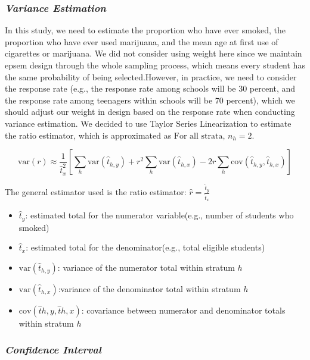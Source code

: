 \documentclass[
  12pt]{article}
\begin{document}
\subsubsection{\texorpdfstring{\emph{Variance
Estimation}}{Variance Estimation}}\label{variance-estimation}

In this study, we need to estimate the proportion who have ever smoked,
the proportion who have ever used marijuana, and the mean age at first
use of cigarettes or marijuana. We did not consider using weight here
since we maintain epsem design through the whole sampling process, which
means every student has the same probability of being selected.However,
in practice, we need to consider the response rate (e.g., the response
rate among schools will be 30 percent, and the response rate among
teenagers within schools will be 70 percent), which we should adjust our
weight in design based on the response rate when conducting variance
estimation. We decided to use Taylor Series Linearization to estimate
the ratio estimator, which is approximated as
\(\text{For all strata, } n_h = 2\).

\[
\text{var}(r) \approx \frac{1}{\hat{t}_x^2} \left[ \sum_h \text{var}(\hat{t}_{h,y}) + r^2 \sum_h \text{var}(\hat{t}_{h,x}) - 2r \sum_h \text{cov}(\hat{t}_{h,y}, \hat{t}_{h,x}) \right]
\]

The general estimator used is the ratio estimator:
\(\hat{r} = \frac{\hat{t}_y}{\hat{t}_x}\)

\begin{itemize}
\item
  \(\hat{t}_y\): estimated total for the numerator variable(e.g., number
  of students who smoked)
\item
  \(\hat{t}_x\): estimated total for the denominator(e.g., total
  eligible students)
\item
  \(\text{var}(\hat{t}_{h,y})\): variance of the numerator total within
  stratum \(h\)
\item
  \(\text{var}(\hat{t}_{h,x})\):variance of the denominator total within
  stratum \(h\)
\item
  \(\text{cov}(\hat{t}{h,y}, \hat{t}{h,x})\): covariance between
  numerator and denominator totals within stratum \(h\)
\end{itemize}

\subsubsection{\texorpdfstring{\emph{Confidence
Interval}}{Confidence Interval}}\label{confidence-interval}
\end{document}

